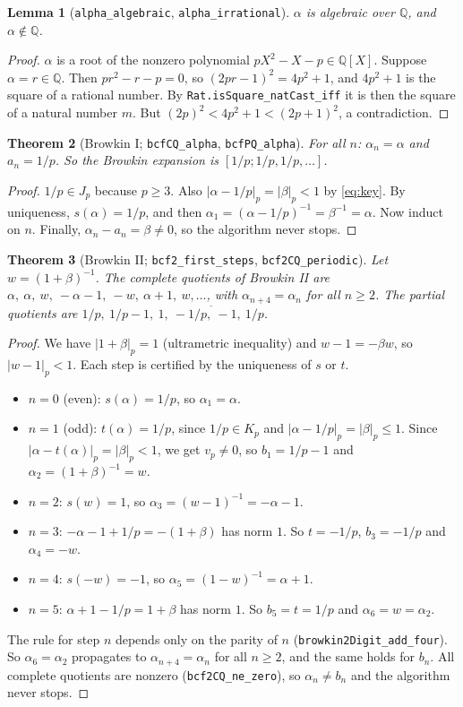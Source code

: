 \documentclass[11pt]{article}
\newtheorem{theorem}{Theorem}
\newtheorem{lemma}[theorem]{Lemma}
\theoremstyle{definition}
\newcommand{\Q}{\mathbb{Q}}
\begin{document}
\begin{lemma}[\texttt{alpha\_algebraic}, \texttt{alpha\_irrational}]
$\alpha$ is algebraic over $\Q$, and $\alpha\notin\Q$.
\end{lemma}
\begin{proof}
$\alpha$ is a root of the nonzero polynomial $pX^2-X-p\in\Q[X]$. Suppose $\alpha=r\in\Q$. Then
$pr^2-r-p=0$, so $(2pr-1)^2=4p^2+1$, and $4p^2+1$ is the square of a rational number. By
\texttt{Rat.isSquare\_natCast\_iff} it is then the square of a natural number $m$. But
$(2p)^2<4p^2+1<(2p+1)^2$, a contradiction.
\end{proof}

\begin{theorem}[Browkin I; \texttt{bcfCQ\_alpha}, \texttt{bcfPQ\_alpha}]
For all $n$: $\alpha_n=\alpha$ and $a_n=1/p$. So the Browkin expansion is $[1/p;1/p,1/p,\dots]$.
\end{theorem}
\begin{proof}
$1/p\in J_p$ because $p\ge3$. Also $|\alpha-1/p|_p=|\beta|_p<1$ by \eqref{eq:key}. By uniqueness,
$s(\alpha)=1/p$, and then $\alpha_1=(\alpha-1/p)^{-1}=\beta^{-1}=\alpha$. Now induct on $n$. Finally,
$\alpha_n-a_n=\beta\ne0$, so the algorithm never stops.
\end{proof}

\begin{theorem}[Browkin II; \texttt{bcf2\_first\_steps}, \texttt{bcf2CQ\_periodic}]
Let $w=(1+\beta)^{-1}$. The complete quotients of Browkin II are
$\alpha,\ \alpha,\ w,\ -\alpha-1,\ -w,\ \alpha+1,\ w,\dots$, with $\alpha_{n+4}=\alpha_n$ for all $n\ge2$. The partial
quotients are $1/p,\ 1/p-1,\ \overline{1,\ -1/p,\ -1,\ 1/p}$.
\end{theorem}
\begin{proof}
We have $|1+\beta|_p=1$ (ultrametric inequality) and $w-1=-\beta w$, so $|w-1|_p<1$. Each step is certified
by the uniqueness of $s$ or $t$.
\begin{itemize}
\item $n=0$ (even): $s(\alpha)=1/p$, so $\alpha_1=\alpha$.
\item $n=1$ (odd): $t(\alpha)=1/p$, since $1/p\in K_p$ and $|\alpha-1/p|_p=|\beta|_p\le1$. Since
  $|\alpha-t(\alpha)|_p=|\beta|_p<1$, we get $v_p\ne0$, so $b_1=1/p-1$ and $\alpha_2=(1+\beta)^{-1}=w$.
\item $n=2$: $s(w)=1$, so $\alpha_3=(w-1)^{-1}=-\alpha-1$.
\item $n=3$: $-\alpha-1+1/p=-(1+\beta)$ has norm $1$. So $t=-1/p$, $b_3=-1/p$ and $\alpha_4=-w$.
\item $n=4$: $s(-w)=-1$, so $\alpha_5=(1-w)^{-1}=\alpha+1$.
\item $n=5$: $\alpha+1-1/p=1+\beta$ has norm $1$. So $b_5=t=1/p$ and $\alpha_6=w=\alpha_2$.
\end{itemize}
The rule for step $n$ depends only on the parity of $n$ (\texttt{browkin2Digit\_add\_four}). So
$\alpha_6=\alpha_2$ propagates to $\alpha_{n+4}=\alpha_n$ for all $n\ge2$, and the same holds for $b_n$. All
complete quotients are nonzero (\texttt{bcf2CQ\_ne\_zero}), so $\alpha_n\ne b_n$ and the algorithm never
stops.
\end{proof}
\end{document}
